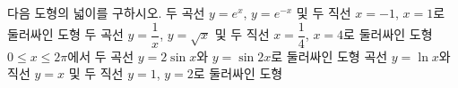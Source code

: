 다음 도형의 넓이를 구하시오.
 두 곡선 $y=e^x$, $y=e^{-x}$ 및 두 직선 $x=-1$, $x=1$로 둘러싸인 도형
 두 곡선 $y=\dfrac{1}{x}$, $y=\sqrt{x}$ 및 두 직선 $x=\dfrac{1}{4}$, $x=4$로 둘러싸인 도형
 $0\le x\le 2\pi$에서 두 곡선 $y=2\sin x$와 $y=\sin 2x$로 둘러싸인 도형
 곡선 $y=\ln x$와 직선 $y=x$ 및 두 직선 $y=1$, $y=2$로 둘러싸인 도형
